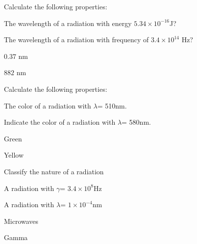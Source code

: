 \documentclass[main.tex]{subfiles}
\begin{document}
\begin{multicols*}{2}
\vspace{-0.5cm}
\begin{question}[ID=\the\value{numA}]
Calculate the following properties:
\begin{inparaenum}[(a)]
\item  The wavelength of a radiation with  energy $5.34\times10^{-16}$J?
\item   The wavelength of a radiation with  frequency of $3.4\times10^{14}$ Hz?  
 \end{inparaenum}
\end{question}
\begin{solution}
\begin{inparaenum}[(a)]
\item   $0.37$ nm
\item   $882$ nm    
\end{inparaenum}\hspace{0.1cm}\end{solution}
\vspace{-0.5cm}\begin{question}[ID=\the\value{numA}]
Calculate the following properties:
\begin{inparaenum}[(a)]
\item   The color of a radiation with $\lambda$= 510nm.
\item    Indicate the color of a radiation with $\lambda$= 580nm.
 \end{inparaenum}
\end{question}
\begin{solution}
\begin{inparaenum}[(a)]
\item    Green
\item    Yellow
\end{inparaenum}\hspace{0.1cm}\end{solution}


\vspace{-0.5cm}\begin{question}[ID=\the\value{numA}]
Classify the nature of a radiation
\begin{inparaenum}[(a)]
\item    A radiation with $\gamma$= $3.4\times 10^{8}$Hz
\item     A radiation with $\lambda$= $1\times 10^{-4}$nm
 \end{inparaenum}
\end{question}
\begin{solution}
\begin{inparaenum}[(a)]
\item     Microwaves
\item     Gamma
\end{inparaenum}\hspace{0.1cm}\end{solution}
 

\end{multicols*}
\end{document}
